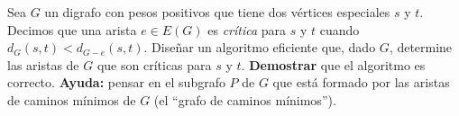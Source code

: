 
  \item Sea $G$ un digrafo con pesos positivos que tiene dos vértices especiales $s$ y $t$.  Decimos que una arista $e \in E(G)$ es \emph{crítica} para $s$ y $t$ cuando $d_G(s,t) < d_{G-e}(s,t)$.  Diseñar un algoritmo eficiente que, dado $G$, determine las aristas de $G$ que son críticas para $s$ y $t$.  \textbf{Demostrar} que el algoritmo es correcto.  \textbf{Ayuda:} pensar en el subgrafo $P$ de $G$ que está formado por las aristas de caminos mínimos de $G$ (el ``grafo de caminos mínimos'').


